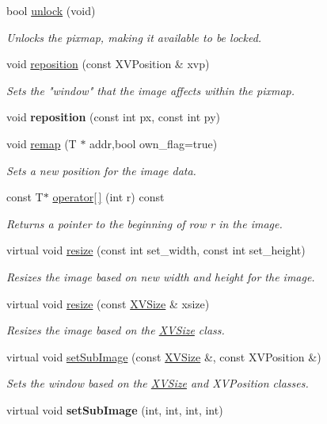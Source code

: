\begin{CompactItemize}
bool \hyperlink{class_XVImageBase_a7}{unlock} (void)
\begin{CompactList}\small\item\em Unlocks the pixmap, making it available to be locked.\item\end{CompactList}\item 
void \hyperlink{class_XVImageBase_a8}{reposition} (const XVPosition \& xvp)
\begin{CompactList}\small\item\em Sets the "window" that the image affects within the pixmap.\item\end{CompactList}\item 
void {\bf reposition} (const int px, const int py)
\item 
void \hyperlink{class_XVImageBase_a10}{remap} (T $\ast$ addr,bool own\_\-flag=true)
\begin{CompactList}\small\item\em Sets a new position for the image data.\item\end{CompactList}\item 
const T$\ast$ \hyperlink{class_XVImageBase_a11}{operator\mbox{[}$\,$\mbox{]}} (int r) const
\begin{CompactList}\small\item\em Returns a pointer to the beginning of row r in the image.\item\end{CompactList}\item 
virtual void \hyperlink{class_XVImageBase_a12}{resize} (const int set\_\-width, const int set\_\-height)
\begin{CompactList}\small\item\em Resizes the image based on new width and height for the image.\item\end{CompactList}\item 
virtual void \hyperlink{class_XVImageBase_a13}{resize} (const \hyperlink{class_XVSize}{XVSize} \& xsize)
\begin{CompactList}\small\item\em Resizes the image based on the \hyperlink{class_XVSize}{XVSize} class.\item\end{CompactList}\item 
virtual void \hyperlink{class_XVImageBase_a14}{set\-Sub\-Image} (const \hyperlink{class_XVSize}{XVSize} \&, const XVPosition \&)
\begin{CompactList}\small\item\em Sets the window based on the \hyperlink{class_XVSize}{XVSize} and XVPosition classes.\item\end{CompactList}\item 
\label{XVImageBase_a15}
\hypertarget{class_XVImageBase_a15}{
virtual void {\bf set\-Sub\-Image} (int, int, int, int)}


\end{CompactItemize}
